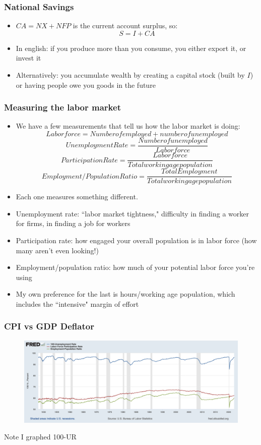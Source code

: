 \documentclass{beamer}
\begin{document}
    \begin{frame}
\frametitle[alignment=center]{National Savings}
\begin{itemize}
\item $CA=NX+NFP$ is the current account surplus, so:
$$S=I+CA$$
\item In english:  if you produce more than you consume, you either export it, or invest it
\item Alternatively:  you accumulate wealth by creating a capital stock (built by $I$) or having people owe you goods in the future
\end{itemize}
\end{frame}

    \begin{frame}
\frametitle[alignment=center]{Measuring the labor market}
\begin{itemize}
\item We have a few measurements that tell us how the labor market is doing:
$$Labor force=Number of employed + number of unemployed$$
$$Unemployment Rate=\frac{Number of unemployed}{Labor force}$$
$$Participation Rate=\frac{Labor force}{Total working age population}$$
$$Employment/Population Ratio=\frac{Total Employment}{Total working age population}$$
\item Each one measures something different.
\item Unemployment rate:  ``labor market tightness," difficulty in finding a worker for firms, in finding a job for workers
\item Participation rate:  how engaged your overall population is in labor force (how many aren't even looking!)
\item Employment/population ratio:  how much of your potential labor force you're using
\item My own preference for the last is hours/working age population, which includes the ``intensive" margin of effort
\end{itemize}
\end{frame}

\begin{frame}
\frametitle[alignment=center]{CPI vs GDP Deflator}
\begin{figure}
\includegraphics[scale=0.26]{Figures/L2_UI_LFP_EPRatio.png}
\end{figure}
Note I graphed 100-UR
\end{frame}
\end{document}
